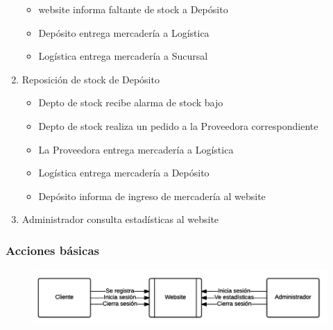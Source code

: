 \begin{enumerate}
\begin{itemize}
    \item website informa faltante de stock a Depósito

    \item Depósito entrega mercadería a Logística

    \item Logística entrega mercadería a Sucursal

  \end{itemize}

  \item Reposición de stock de Depósito

  \begin{itemize}

    \item Depto de stock recibe alarma de stock bajo 

    \item Depto de stock realiza un pedido a la Proveedora correspondiente

    \item La Proveedora entrega mercadería a Logística

    \item Logística entrega mercadería a Depósito

    \item Depósito informa de ingreso de mercadería al website

  \end{itemize}

  \item Administrador consulta estadísticas al website

\end{enumerate}

\subsubsection{Acciones básicas}
\begin{figure}[H]
  \includegraphics[width=\linewidth]{images/acciones-basicas.png}
\end{figure}

\clearpage
